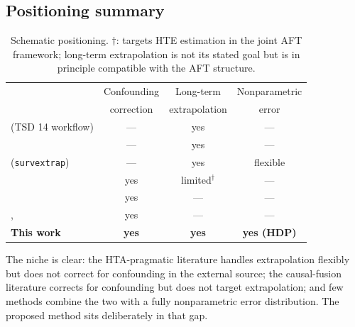 \documentclass[11pt]{article}
\theoremstyle{plain}
\theoremstyle{definition}
\theoremstyle{remark}
\newcommand{\1}{\mathds{1}}
\begin{document}
\subsection{Positioning summary}

\begin{table}[tb]
\centering\small
\begin{tabular}{lccc}
\toprule
& Confounding & Long-term      & Nonparametric \\
& correction  & extrapolation  & error         \\
\midrule
\citet{Latimer2013} (TSD 14 workflow)        & --- & yes & ---  \\
\citet{Guyot2017}                            & --- & yes & ---  \\
\citet{Jackson2023} (\texttt{survextrap})    & --- & yes & flexible \\
\citet{Ye2025}                               & yes & limited$^\dagger$ & --- \\
\citet{YangLiuZengWang2025}                  & yes & ---       & --- \\
\citet{Kallus2018}, \citet{Yao2024}          & yes & ---       & --- \\
\textbf{This work}                           & \textbf{yes} & \textbf{yes} & \textbf{yes (HDP)} \\
\bottomrule
\end{tabular}
\caption{Schematic positioning. $\dagger$: \citet{Ye2025} targets HTE
estimation in the joint AFT framework; long-term extrapolation is not its
stated goal but is in principle compatible with the AFT structure.}
\end{table}

The niche is clear: the HTA-pragmatic literature handles extrapolation
flexibly but does not correct for confounding in the external source; the
causal-fusion literature corrects for confounding but does not target
extrapolation; and few methods combine the two with a fully nonparametric
error distribution. The proposed method sits deliberately in that gap.



\end{document}
